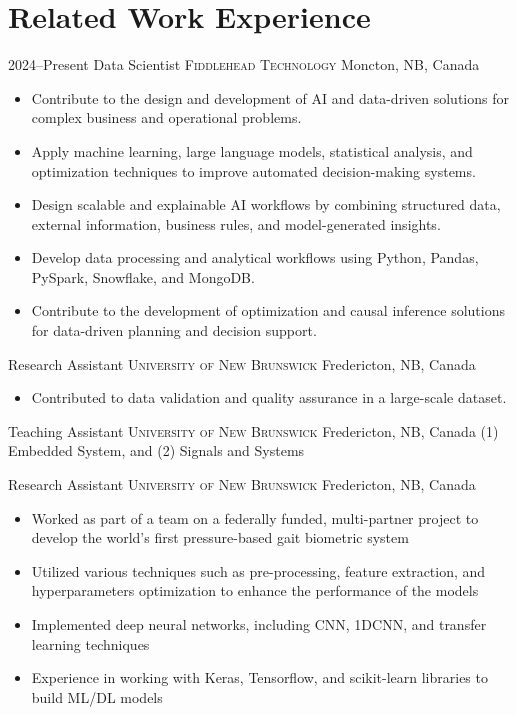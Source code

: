 \section{Related Work Experience}

\cventry
{2024--Present}
{Data Scientist}
{\textsc{Fiddlehead Technology}}
{Moncton, NB, Canada}
{}
{
\begin{itemize}
    \item Contribute to the design and development of AI and data-driven solutions for complex business and operational problems.
    \item Apply machine learning, large language models, statistical analysis, and optimization techniques to improve automated decision-making systems.
    \item Design scalable and explainable AI workflows by combining structured data, external information, business rules, and model-generated insights.
    \item Develop data processing and analytical workflows using Python, Pandas, PySpark, Snowflake, and MongoDB.
    \item Contribute to the development of optimization and causal inference solutions for data-driven planning and decision support.
\end{itemize}
}


{Research Assistant}
{\textsc{University of New Brunswick}}
{Fredericton, NB, Canada}
{}
{
\begin{itemize}
    \item Contributed to data validation and quality assurance in a large-scale dataset.
\end{itemize}
}

{Teaching Assistant}
{\textsc{University of New Brunswick}}
{Fredericton, NB, Canada}
{}
{
(1) Embedded System, and (2) Signals and Systems
}

{Research Assistant}
{\textsc{University of New Brunswick}}
{Fredericton, NB, Canada}
{}
{
\begin{itemize}
    \item Worked as part of a team on a federally funded, multi-partner project to develop the world’s first pressure-based gait biometric system
    \item Utilized various techniques such as pre-processing, feature extraction, and hyperparameters optimization to enhance the performance of the models
    \item Implemented deep neural networks, including CNN, 1DCNN, and transfer learning techniques
    \item Experience in working with Keras, Tensorflow, and scikit-learn libraries to build ML/DL models
\end{itemize}
}

